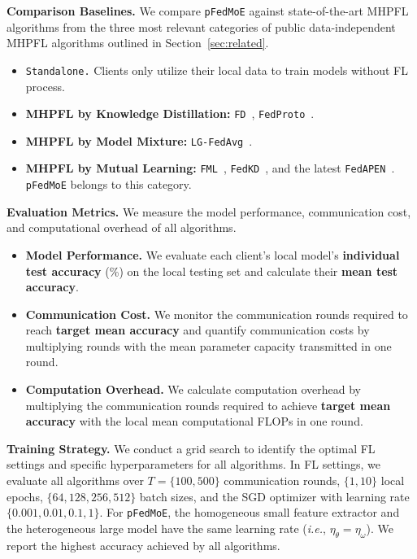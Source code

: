 \documentclass[sigconf]{acmart}
\newcommand{\hetero}{heterogeneous }
\newcommand{\homo}{homogeneous }
\newcommand{\sota}{state-of-the-art }
\newcommand{\methodname}{{\tt{pFedMoE}}}
\begin{document}
\textbf{Comparison Baselines.} We compare \methodname{} against \sota MHPFL algorithms from the three most relevant categories of public data-independent MHPFL algorithms outlined in Section~\ref{sec:related}.
\begin{itemize}
    \item {\tt{Standalone.}} Clients only utilize their local data to train models without FL process.
    \item \textbf{MHPFL by Knowledge Distillation:} {\tt{FD}}~\citep{FD}, {\tt{FedProto}}~\citep{FedProto}.
    \item \textbf{MHPFL by Model Mixture:} {\tt{LG-FedAvg}}~\citep{LG-FedAvg}.
    \item \textbf{MHPFL by Mutual Learning:} {\tt{FML}}~\citep{FML}, {\tt{FedKD}}~\citep{FedKD}, and the latest {\tt{FedAPEN}}~\citep{FedAPEN}. \methodname{} belongs to this category.
\end{itemize}

\textbf{Evaluation Metrics.} We measure the model performance, communication cost, and computational overhead of all algorithms.
\begin{itemize}
    \item \textbf{Model Performance.} We evaluate each client's local model's \textbf{individual test accuracy} (\%) on the local testing set and calculate their \textbf{mean test accuracy}.
    \item \textbf{Communication Cost.} We monitor the communication rounds required to reach \textbf{target mean accuracy} and quantify communication costs by multiplying rounds with the mean parameter capacity transmitted in one round.
    \item \textbf{Computation Overhead.} We calculate computation overhead by multiplying the communication rounds required to achieve \textbf{target mean accuracy} with the local mean computational FLOPs in one round.
\end{itemize}

\textbf{Training Strategy.}
We conduct a grid search to identify the optimal FL settings and specific hyperparameters for all algorithms. In FL settings, we evaluate all algorithms over $T=\{100, 500\}$ communication rounds, $\{1, 10\}$ local epochs, $\{64, 128, 256, 512\}$ batch sizes, and the SGD optimizer with learning rate $\{0.001, 0.01, 0.1, 1\}$. For \methodname{}, the \homo small feature extractor and the \hetero large model have the same learning rate (\emph{i.e.}, $\eta_\theta=\eta_\omega$). We report the highest accuracy achieved by all algorithms.
\end{document}
